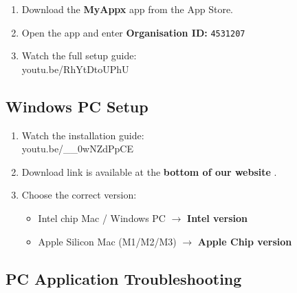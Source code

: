 \begin{stepbox}
  \small
  \begin{enumerate}
    \item Download the \textbf{MyAppx} app from the App Store.
    \item Open the app and enter \textbf{Organisation ID:} \texttt{4531207}
    \item Watch the full setup guide:\\
                 {youtu.be/RhYtDtoUPhU}
  \end{enumerate}
\end{stepbox}

\subsection{\faWindows\enspace Windows PC Setup}

\begin{stepbox}
  \small
  \begin{enumerate}
    \item Watch the installation guide:\\
                 {youtu.be/\_\_0wNZdPpCE}
    \item Download link is available at the \textbf{bottom of our website}
          .
    \item Choose the correct version:
          \begin{itemize}
            \item Intel chip Mac / Windows PC $\to$ \textbf{Intel version}
            \item Apple Silicon Mac (M1/M2/M3) $\to$ \textbf{Apple Chip version}
          \end{itemize}
  \end{enumerate}
\end{stepbox}

\subsection{\faDesktop\enspace PC Application Troubleshooting}

